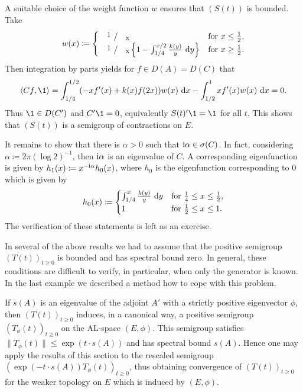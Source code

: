 \begin{example}
A suitable choice of the weight function $w$ ensures that $(S(t))$ is bounded.
Take
\begin{equation}\label{eq:c4-2.14}
w(x) \coloneq \begin{cases}
    \text{\sfrac{1}{x}} & \text{for } x \leq \frac{1}{2}, \\
    \text{\sfrac{1}{x}} \left\{1 - \int_{1/4}^{x/2} \frac{k(y)}{y} \, \dy \right\} & \text{for } x \geq \frac{1}{2}.
\end{cases}
\end{equation}
Then integration by parts yields for $f \in D(A) = D(C)$ that
\begin{align*}
\langle Cf,\1 \rangle = \int_{1/4}^{1/2} (-xf'(x) + k(x)f(2x))w(x) \, \dx - \int_{1/2}^{1} xf'(x)w(x) \, \dx = 0.
\end{align*}
Thus $\1 \in D(C')$ and $C'\1 = 0$, equivalently $S(t)'\1 = \1$ for all $t$.
This shows that $(S(t))$ is a semigroup of contractions on $E$.

It remains to show that there is $\alpha > 0$ such that $\mathrm{i}\alpha \in \sigma(C)$.
In fact, considering $\alpha \coloneq 2\pi(\log 2)^{-1}$,  then $\mathrm{i}\alpha$ is an eigenvalue of\/ $C$.
A corresponding eigenfunction is given by $h_{1}(x) \coloneq  x^{-\mathrm{i}\alpha}h_{0}(x)$, where $h_{0}$ is the eigenfunction corresponding to $0$ which is given by
\begin{equation}\label{eq:c4-2.15}
h_{0}(x) \coloneq  \begin{cases}
    \int_{1/4}^{x} \frac{k(y)}{y} \, \dy & \text{for } \frac{1}{4} \leq x \leq \frac{1}{2}, \\
    1 & \text{for } \frac{1}{2} \leq x \leq 1.
\end{cases}
\end{equation}
The verification of these statements is left as an exercise.
\end{example}
In several of the above results we had to assume that the positive semigroup $(T(t))_{t\geq 0}$ is bounded and has spectral bound zero.
In general, these conditions are difficult to verify, in particular, when only the generator is known.
In the last example we described a method how to cope with this problem. 

If\/ $s(A)$ is an eigenvalue of the adjoint $A'$ with a strictly positive eigenvector $\phi$, then $(T(t))_{t\geq 0}$ induces, in a canonical way, a positive semigroup $(T_{\phi}(t))_{t \geq 0}$ on the AL-space $(E,\phi)$.
This semigroup satisfies $\|T_{\phi}(t)\| \leq \exp(t \cdot s(A))$ and has spectral bound $s(A)$.
Hence one may apply the results of this section to the rescaled semigroup $(\exp(-t \cdot s(A))T_{\phi}(t))_{t \geq 0}$, thus obtaining convergence of\/ $(T(t))_{t \geq 0}$ for the weaker topology on $E$ which is induced by $(E,\phi)$.

